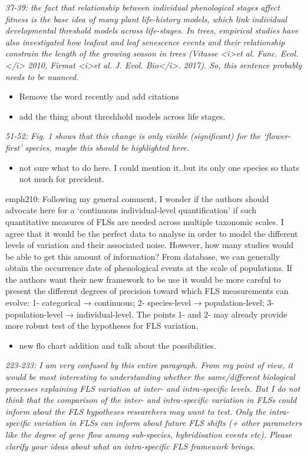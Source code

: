 \documentclass{article}[11pt]
\begin{document}
\emph{ 37-39: the fact that relationship between individual phenological stages affect fitness is the base idea of many plant life-history models, which link individual developmental threshold models across life-stages. In trees, empirical studies have also investigated how leafout and leaf senescence events and their relationship constrain the length of the growing season in trees (Vitasse <i>et al. Func. Ecol.</i> 2010, Firmat <i>et al. J. Evol. Bio</i>. 2017). So, this sentence probably needs to be nuanced.}
\begin{itemize}
\item Remove the word recently and add citations
\item add the thing about threshhold models across life stages.
\end{itemize}
\emph{51-52: Fig. 1 shows that this change is only visible (significant) for the ‘flower-first’ species, maybe this should be highlighted here.}
\begin{itemize}
\item not sure what to do here. I could mention it..but its only one species so thats not much for precident.
\end{itemize}
emph{210: Following my general comment, I wonder if the authors should advocate here for a ‘continuous individual-level quantification’ if such quantitative measures of FLSs are needed across multiple taxonomic scales. I agree that it would be the perfect data to analyse in order to model the different levels of variation and their associated noise. However, how many studies would be able to get this amount of information? From database, we can generally obtain the occurrence date of phenological events at the scale of populations. If the authors want their new framework to be use it would be more careful to present the different degrees of precision toward which FLS measurements can evolve: 1- categorical → continuous; 2- species-level → population-level; 3- population-level → individual-level. The points 1- and 2- may already provide more robust test of the hypotheses for FLS variation.}
\begin{itemize}
\item new flo chart addition and talk about the possibilities.
\end{itemize}
\emph{ 223-233: I am very confused by this entire paragraph. From my point of view, it would be most interesting to understanding whether the same/different biological processes explaining FLS variation at inter- and intra-specific levels. But I do not think that the comparison of the inter- and intra-specific variation in FLSs could inform about the FLS hypotheses researchers may want to test. Only the intra-specific variation in FLSs can inform about future FLS shifts (+ other parameters like the degree of gene flow among sub-species, hybridisation events etc). Please clarify your ideas about what an intra-specific FLS framework brings.}
\end{document}
